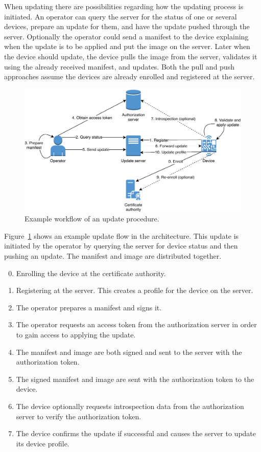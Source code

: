 \documentclass[0-thesis.tex]{subfiles}
\begin{document}
When updating there are possibilities regarding how the updating process is initiated. An
operator can query the server for the status of one or several devices, prepare an update
for them, and have the update pushed through the server. Optionally the operator could
send a manifest to the device explaining when the update is to be applied and put the
image on the server. Later when the device should update, the device pulls the image from
the server, validates it using the already received manifest, and updates. Both the pull
and push approaches assume the devices are already enrolled and registered at the server.

\begin{figure}
    \caption{Example workflow of an update procedure.}
    \label{fig:communication-workflow}
    \includegraphics{images/update-flow.pdf}
\end{figure}

Figure~\ref{fig:communication-workflow} shows an example update flow in the architecture.
This update is initiated by the operator by querying the server for device status and then
pushing an update. The manifest and image are distributed together.

\begin{enumerate}[label=0.\arabic*]
    \setcounter{enumi}{-1}
    \item Enrolling the device at the certificate authority.
    \item Registering at the server. This creates a profile for the device on the server.
    \item The operator prepares a manifest and signs it.
    \item The operator requests an access token from the authorization server in order to
            gain access to applying the update.
    \item The manifest and image are both signed and sent to the server with the
            authorization token.
    \item The signed manifest and image are sent with the authorization token to the
            device.
    \item The device optionally requests introspection data from the authorization server
            to verify the authorization token.
    \item The device confirms the update if successful and causes the server to update
            its device profile.
\end{enumerate}
\end{document}
